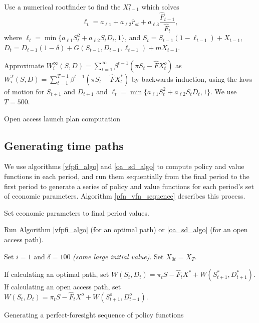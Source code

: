 \documentclass[12pt]{article}
\begin{document}
\begin{algorithm}[H]
	Use a numerical rootfinder to find the $X_{t-1}^o$ which solves
	\[ \ell_t =  a_{\ell 1} + a_{\ell 2} \hat{r}_{st} + a_{\ell 3} \frac{\hat{F}_{t-1}}{\hat{F}_t}, \]
	where $\ell_t = \min\{ a_{\ell 1} S_t^2 + a_{\ell 2} S_t D_t, 1\}$, and $S_t = S_{t-1}(1-\ell_{t-1}) + X_{t-1}$, $D_t = D_{t-1}(1-\delta) + G(S_{t-1},D_{t-1},\ell_{t-1}) + mX_{t-1}$.
	
	Approximate $W_i^{\infty}(S,D) = \sum_{t=1}^{\infty} \beta^{t-1} (\pi S_t - \hat{F} X_t^o)$ as $W_i^T(S,D) = \sum_{t=1}^{T-1} \beta^{t-1} (\pi S_t - \hat{F} X_t^*)$ by backwards induction, using the laws of motion for $S_{t+1}$ and $D_{t+1}$ and $\ell_t = \min\{ a_{\ell 1} S_t^2 + a_{\ell 2} S_t D_t, 1\}$. We use $T=500$.
	
	\caption{Open access launch plan computation}\label{oa_sd_algo}
\end{algorithm}

\subsection{Generating time paths}

We use algorithms \ref{vfpfi_algo} and \ref{oa_sd_algo} to compute policy and value functions in each period, and run them sequentially from the final period to the first period to generate a series of policy and value functions for each period's set of economic parameters. Algorithm \ref{pfn_vfn_sequence} describes this process. \\

\begin{algorithm}[H]
	Set economic parameters to final period values.
	
	Run Algorithm \ref{vfpfi_algo} (for an optimal path) or \ref{oa_sd_algo} (for an open access path).
	
	 {
		Set $i=1$ and $\delta = 100$ \textit{(some large initial value)}. Set $X_{0t} = X_T$.
		
		If calculating an optimal path, set $W(S_t,D_t) = \pi_t S - \hat{F}_t X^* + W(S^*_{t+1},D^*_{t+1})$. If calculating an open access path, set $W(S_t,D_t) = \pi_t S - \hat{F}_t X^o + W(S^o_{t+1},D^o_{t+1})$.
	}
	\caption{Generating a perfect-foresight sequence of policy functions}\label{pfn_vfn_sequence}
\end{algorithm}
\end{document}
